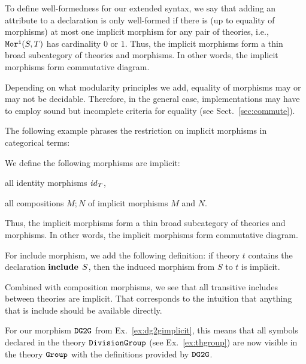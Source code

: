 To define well-formedness for our extended syntax, we say that adding an attribute to a declaration is only well-formed if there is (up to equality of morphisms) at most one implicit morphism for any pair of theories, i.e., $\mathtt{Mor^i}(S,T)$ has cardinality $0$ or $1$.
Thus, the implicit morphisms form a thin broad subcategory of theories and morphisms.
In other words, the implicit morphisms form commutative diagram.

\begin{modexp}
Depending on what modularity principles we add, equality of morphisms may or may not be decidable.
Therefore, in the general case, implementations may have to employ sound but incomplete criteria for equality (see Sect.~\ref{sec:commute}).
\end{modexp}

\begin{modexp}
The following example phrases the restriction on implicit morphisms in categorical terms:
\begin{example}\label{impl:cat}
We define the following morphisms are implicit:
\begin{compactitem}
 \item all identity morphisms $\mathit{id}_{T}$,
 \item all compositions $M;N$ of implicit morphisms $M$ and $N$.
\end{compactitem}
Thus, the implicit morphisms form a thin broad subcategory of theories and morphisms.
In other words, the implicit morphisms form commutative diagram.
\end{example}
\end{modexp}

\begin{example}\label{impl:incl}
For include morphism, we add the following definition: if theory $t$ contains the declaration $\operatorname{\mathbf{include}}{\;S}$, then the induced morphism from $S$ to $t$ is implicit.

Combined with composition morphisms, we see that all transitive includes between theories are implicit.
That corresponds to the intuition that anything that is include should be available directly.
\end{example}

\begin{example}
	For our morphism $\operatorname{\mathtt{DG2G}}$ from Ex.~\ref{ex:dg2gimplicit}, this means that all symbols declared in the theory $\operatorname{\mathtt{DivisionGroup}}$ (see Ex.~\ref{ex:thgroup}) are now visible in the theory $\operatorname{\mathtt{Group}}$ with the definitions provided by $\operatorname{\mathtt{DG2G}}$.
\end{example}

